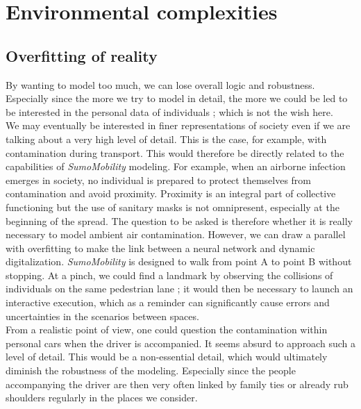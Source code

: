 \chapter{Environmental complexities}

\section{Overfitting of reality}

By wanting to model too much, we can lose overall logic and robustness. Especially since the more we try to model in detail, the more we could be led to be interested in the personal data of individuals ; which is not the wish here.\\

We may eventually be interested in finer representations of society even if we are talking about a very high level of detail. This is the case, for example, with contamination during transport. This would therefore be directly related to the capabilities of \textit{SumoMobility} modeling. For example, when an airborne infection emerges in society, no individual is prepared to protect themselves from contamination and avoid proximity. Proximity is an integral part of collective functioning but the use of sanitary masks is not omnipresent, especially at the beginning of the spread. The question to be asked is therefore whether it is really necessary to model ambient air contamination. However, we can draw a parallel with overfitting to make the link between a neural network and dynamic digitalization. \textit{SumoMobility} is designed to walk from point A to point B without stopping. At a pinch, we could find a landmark by observing the collisions of individuals on the same pedestrian lane ; it would then be necessary to launch an interactive execution, which as a reminder can significantly cause errors and uncertainties in the scenarios between spaces.\\

From a realistic point of view, one could question the contamination within personal cars when the driver is accompanied. It seems absurd to approach such a level of detail. This would be a non-essential detail, which would ultimately diminish the robustness of the modeling. Especially since the people accompanying the driver are then very often linked by family ties or already rub shoulders regularly in the places we consider.\\

\newpage

